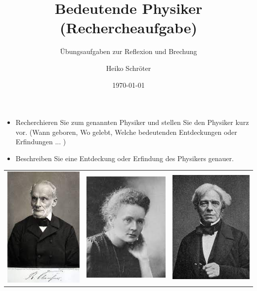 \documentclass[a4paper]{scrartcl}
\author{Heiko Schröter}
\date{\today}
\title{Bedeutende Physiker\\
(Rechercheaufgabe)}
\subtitle{Übungsaufgaben zur Reflexion und Brechung}
\begin{document}


\begin{aufgabe}[points={6}]
	\begin{itemize}

	\item Recherchieren Sie zum genannten Physiker und stellen Sie den Physiker kurz vor. (Wann geboren, Wo gelebt, Welche bedeutenden Entdeckungen oder Erfindungen ... )
	\item Beschreiben Sie eine Entdeckung oder Erfindung des Physikers genauer.
		
	\end{itemize}
	\begin{longtable}{|>{\centering\arraybackslash}p{4.2cm}|>{\centering\arraybackslash}p{4.2cm}|>{\centering\arraybackslash}p{4.2cm}|}
	\hline 
	\includegraphics[scale=0.5]{Clausius.jpg} & \includegraphics[scale=0.5]{Curie.jpg} & \includegraphics[scale=0.5]{Faraday.jpg} \\ 

\end{longtable}
\end{aufgabe}
\end{document}
